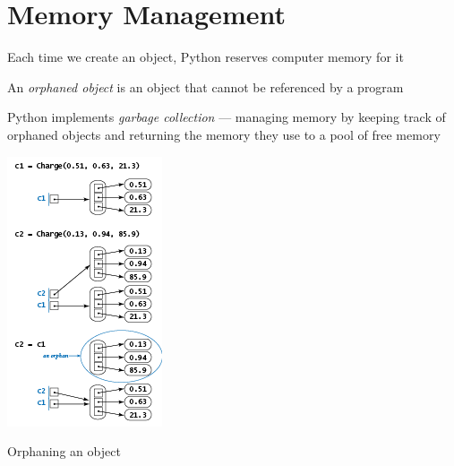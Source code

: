 \documentclass[8pt,a4paper,compress,handout]{beamer}
\begin{document}
\section{Memory Management}
\begin{frame}[fragile]
\begin{minipage}{200pt}
Each time we create an object, Python reserves computer memory for it

\bigskip

An \emph{orphaned object} is an object that cannot be referenced by a program

\bigskip

Python implements \emph{garbage collection} --- managing memory by keeping track of orphaned objects and returning the memory they use to a pool of free memory
\end{minipage}%
\begin{minipage}{100pt}
\begin{center}
\includegraphics[scale=0.45]{figures/orphaning.png}

\smallskip

\tiny Orphaning an object
\end{center}
\end{minipage}
\end{frame}
\end{document}
